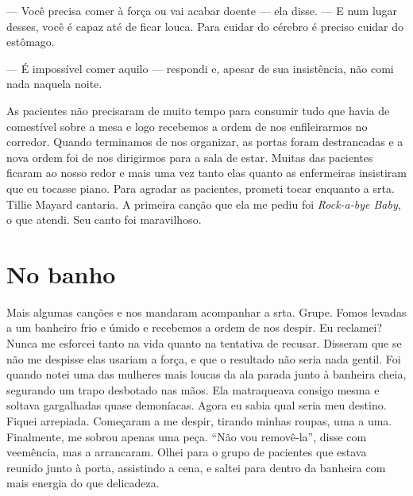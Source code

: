 --- Você precisa comer à força ou vai acabar doente --- ela disse. --- E
num lugar desses, você é capaz até de ficar louca. Para cuidar do
cérebro é preciso cuidar do estômago.

--- É impossível comer aquilo --- respondi e, apesar de sua insistência,
não comi nada naquela noite.

As pacientes não precisaram de muito tempo para consumir tudo que havia
de comestível sobre a mesa e logo recebemos a ordem de nos enfileirarmos
no corredor. Quando terminamos de nos organizar, as portas foram
destrancadas e a nova ordem foi de nos dirigirmos para a sala de estar.
Muitas das pacientes ficaram ao nosso redor e mais uma vez tanto elas
quanto as enfermeiras insistiram que eu tocasse piano. Para agradar as
pacientes, prometi tocar enquanto a srta. Tillie Mayard cantaria. A
primeira canção que ela me pediu foi \emph{Rock-a-bye Baby}, o que atendi.
Seu canto foi maravilhoso.

\chapter{No banho}\label{capuxedtulo-xi-no-banho}

Mais algumas canções e nos mandaram acompanhar a srta. Grupe. Fomos
levadas a um banheiro frio e úmido e recebemos a ordem de nos despir. Eu
reclamei? Nunca me esforcei tanto na vida quanto na tentativa de
recusar. Disseram que se não me despisse elas usariam a força, e que o
resultado não seria nada gentil. Foi quando notei uma das mulheres mais
loucas da ala parada junto à banheira cheia, segurando um trapo
desbotado nas mãos. Ela matraqueava consigo mesma e soltava gargalhadas
quase demoníacas. Agora eu sabia qual seria meu destino. Fiquei
arrepiada. Começaram a me despir, tirando minhas roupas, uma a uma.
Finalmente, me sobrou apenas uma peça. ``Não vou removê-la'', disse
com veemência, mas a arrancaram. Olhei para o grupo de pacientes
que estava reunido junto à porta, assistindo a cena, e saltei para
dentro da banheira com mais energia do que delicadeza.


